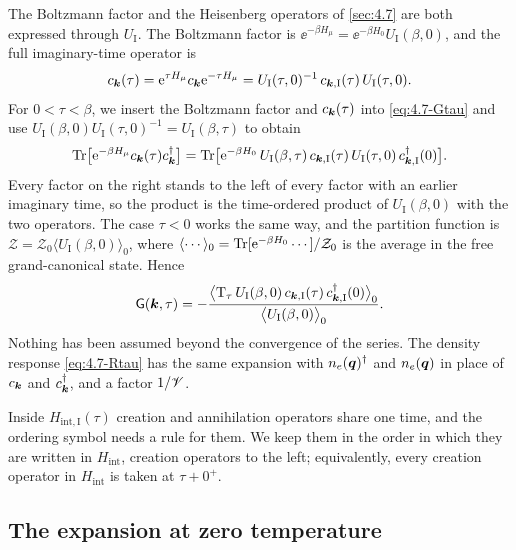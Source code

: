 The Boltzmann factor and the Heisenberg operators of \cref{sec:4.7} are both expressed through $U_{\mathrm{I}}$. The Boltzmann factor is $\ee^{-\beta H_\mu} = \ee^{-\beta H_0}U_{\mathrm{I}}(\beta,0)$, and the full imaginary-time operator is
\begin{equation*}
  c_{\bm{k}}(\tau) = \mathrm{e}^{\tau H_\mu}c_{\bm{k}}\mathrm{e}^{-\tau H_\mu} = U_{\mathrm{I}}(\tau,0)^{-1}\,c_{\bm{k},\mathrm{I}}(\tau)\,U_{\mathrm{I}}(\tau,0) .
\end{equation*} For $0 < \tau < \beta$, we insert the Boltzmann factor and $c_{\bm{k}}(\tau)$ into \cref{eq:4.7-Gtau} and use $U_{\mathrm{I}}(\beta,0)U_{\mathrm{I}}(\tau,0)^{-1} = U_{\mathrm{I}}(\beta,\tau)$ to obtain
\begin{equation*}
  \operatorname{Tr}\bigl[\mathrm{e}^{-\beta H_\mu}c_{\bm{k}}(\tau)c^\dagger_{\bm{k}}\bigr] = \operatorname{Tr}\bigl[\mathrm{e}^{-\beta H_0}\,U_{\mathrm{I}}(\beta,\tau)\,c_{\bm{k},\mathrm{I}}(\tau)\,U_{\mathrm{I}}(\tau,0)\,c^\dagger_{\bm{k},\mathrm{I}}(0)\bigr] .
\end{equation*}
Every factor on the right stands to the left of every factor with an earlier imaginary time, so the product is the time-ordered product of $U_{\mathrm{I}}(\beta,0)$ with the two operators. The case $\tau < 0$ works the same way, and the partition function is $\mathcal{Z} = \mathcal{Z}_0\langle U_{\mathrm{I}}(\beta,0)\rangle_0$, where $\langle\cdots\rangle_0 = \operatorname{Tr}[\mathrm{e}^{-\beta H_0}\cdots]/\mathcal{Z}_0$ is the average in the free grand-canonical state. Hence
\begin{equation}
  \mathsf{G}(\bm{k},\tau) = -\frac{\bigl\langle\mathrm{T}_\tau\,U_{\mathrm{I}}(\beta,0)\,c_{\bm{k},\mathrm{I}}(\tau)\,c^\dagger_{\bm{k},\mathrm{I}}(0)\bigr\rangle_0}{\bigl\langle U_{\mathrm{I}}(\beta,0)\bigr\rangle_0} .
  \label{eq:D.11-Gexp}
\end{equation}
Nothing has been assumed beyond the convergence of the series. The density response \cref{eq:4.7-Rtau} has the same expansion with $n_e(\bm{q})^\dagger$ and $n_e(\bm{q})$ in place of $c_{\bm{k}}$ and $c^\dagger_{\bm{k}}$, and a factor $1/\mathscr{V}$.

Inside $H_{\mathrm{int},\mathrm{I}}(\tau)$ creation and annihilation operators share one time, and the ordering symbol needs a rule for them. We keep them in the order in which they are written in $H_{\mathrm{int}}$, creation operators to the left; equivalently, every creation operator in $H_{\mathrm{int}}$ is taken at $\tau + 0^+$.

\subsection*{The expansion at zero temperature}

